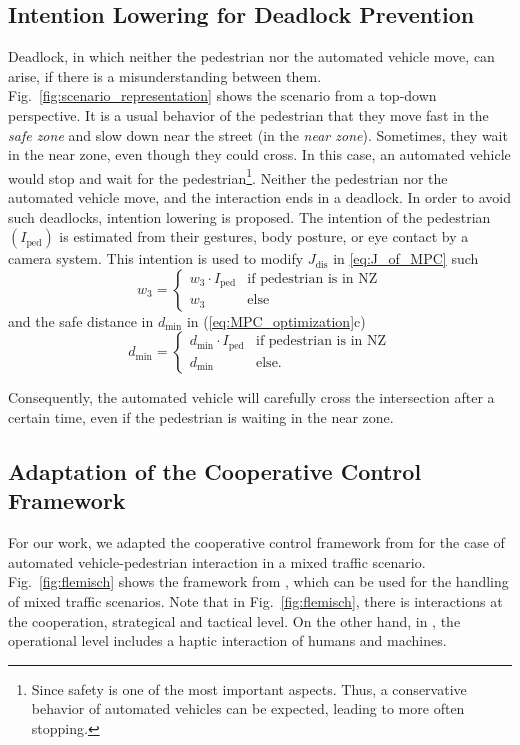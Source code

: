 \documentclass[conference]{IEEEtran}
\begin{document}
	
	
	
	
	\subsection{Intention Lowering for Deadlock Prevention}
	Deadlock, in which neither the pedestrian nor the automated vehicle move, can arise, if there is a misunderstanding between them. Fig.~\ref{fig:scenario_representation} shows the scenario from a top-down perspective. It is a usual behavior of the pedestrian that they move fast in the \textit{safe zone} and slow down near the street (in the \textit{near zone}). Sometimes, they wait in the near zone, even though they could cross. In this case, an automated vehicle would stop and wait for the pedestrian\footnote{Since safety is one of the most important aspects. Thus, a conservative behavior of automated vehicles can be expected, leading to more often stopping.}. Neither the pedestrian nor the automated vehicle move, and the interaction ends in a deadlock. In order to avoid such deadlocks, intention lowering is proposed. The intention of the pedestrian $\left(I_\mathrm{ped}\right)$ is estimated from their gestures, body posture, or eye contact by a camera system. This intention is used to modify $J_\mathrm{dis}$ in \eqref{eq:J_of_MPC} such
	\begin{equation}
		w_{3} =
		\begin{cases}
			w_{3} \cdot I_\mathrm{ped} & \text{if pedestrian is in NZ} \\
			w_{3} & \text{else}
		\end{cases}
	\end{equation}
	and the safe distance in $d_\mathrm{min}$ in (\ref{eq:MPC_optimization}c)
	\begin{equation}
		d_\mathrm{min} = 
		\begin{cases}
			d_\mathrm{min} \cdot I_\mathrm{ped} & \text{if pedestrian is in NZ} \\
			d_\mathrm{min} & \text{else}.
		\end{cases}
	\end{equation}
	
	Consequently, the automated vehicle will carefully cross the intersection after a certain time, even if the pedestrian is waiting in the near zone.
	
	
	\subsection{Adaptation of the Cooperative Control Framework}
	For our work, we adapted the cooperative control framework from \cite{2016_SharedControlSharp_flemisch} for the case of automated vehicle-pedestrian interaction in a mixed traffic scenario. Fig.~\ref{fig:flemisch} shows the framework from \cite{2016_SharedControlSharp_flemisch}, which can be used for the handling of mixed traffic scenarios. Note that in Fig.~\ref{fig:flemisch}, there is interactions at the cooperation, strategical and tactical level. On the other hand, in \cite{2016_SharedControlSharp_flemisch}, the operational level includes a haptic interaction of humans and machines.
	
\end{document}
